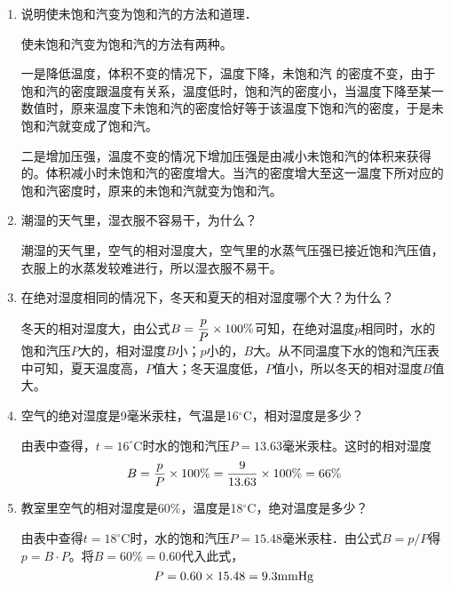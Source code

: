 \begin{enumerate}
	\item 说明使未饱和汽变为饱和汽的方法和道理．
    
  \begin{solution}
使未饱和汽变为饱和汽的方法有两种。

一是降低温度，体积不变的情况下，温度下降，未饱和汽
的密度不变，由于饱和汽的密度跟温度有关系，温度低时，饱和汽的密度小，当温度下降至某一数值时，原来温度下未饱和汽的密度恰好等于该温度下饱和汽的密度，于是未饱和汽就变成了饱和汽。

二是增加压强，温度不变的情况下增加压强是由减小未饱和汽的体积来获得的。体积减小时未饱和汽的密度增大。当汽的密度增大至这一温度下所对应的饱和汽密度时，原来的未饱和汽就变为饱和汽。
  \end{solution}
\item 潮湿的天气里，湿衣服不容易干，为什么？
    
\begin{solution}
  潮湿的天气里，空气的相对湿度大，空气里的水蒸气压强已接近饱和汽压值，衣服上的水蒸发较难进行，所以湿衣服不易干。
\end{solution}
\item 在绝对湿度相同的情况下，冬天和夏天的相对湿度哪个大？为什么？
    
\begin{solution}
冬天的相对湿度大，由公式$B=\dfrac{p}{P}\times 100\%$可知，在绝对温度$p$相同时，水的饱和汽压$P$大的，相对湿度$B$小；$p$小的，$B$大。从不同温度下水的饱和汽压表中可知，夏天温度高，$P$值大；冬天温度低，$P$值小，所以冬天的相对湿度$B$值大。
\end{solution}
\item 空气的绝对湿度是9毫米汞柱，气温是16$^\circ$C，相对湿度是多少？
    
\begin{solution}
由表中查得，$t=16^{\circ}$C时水的饱和汽压$P=13.63$毫米汞柱。这时的相对湿度
\[B=\frac{p}{P}\times100\%=\frac{9}{13.63}\times100\%=66\%\]
\end{solution}
\item 教室里空气的相对湿度是60\%，温度是18$^\circ$C，绝对温度是多少？
    
\begin{solution}
  由表中查得$t=18^{\circ}$C时，水的饱和汽压$P=15.48$毫米汞柱．由公式$B=p/P$得$p=B\cdot P$。将$B=60\%=0.60$代入此式，
  \[P=0.60\times15.48=9.3{\rm mmHg}\]
\end{solution}
\end{enumerate}






